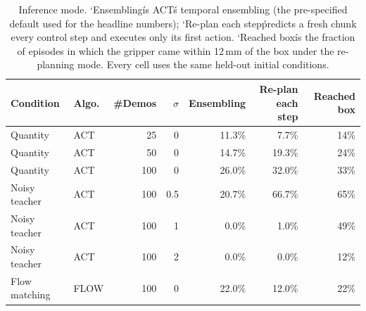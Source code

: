 \begin{table}[t]
\centering
\small
\begin{tabular}{llrrrrr}
\toprule
Condition & Algo. & \#Demos & $\sigma$ & Ensembling & Re-plan each step & Reached box \\
\midrule
Quantity & ACT & 25 & 0 & 11.3\% & 7.7\% & 14\% \\
Quantity & ACT & 50 & 0 & 14.7\% & 19.3\% & 24\% \\
Quantity & ACT & 100 & 0 & 26.0\% & 32.0\% & 33\% \\
\midrule
Noisy teacher & ACT & 100 & 0.5 & 20.7\% & 66.7\% & 65\% \\
Noisy teacher & ACT & 100 & 1 & 0.0\% & 1.0\% & 49\% \\
Noisy teacher & ACT & 100 & 2 & 0.0\% & 0.0\% & 12\% \\
\midrule
Flow matching & FLOW & 100 & 0 & 22.0\% & 12.0\% & 22\% \\
\bottomrule
\end{tabular}
\caption{Inference mode. `Ensembling\' is ACT\'s temporal ensembling (the pre-specified default used for the headline numbers); `Re-plan each step\' predicts a fresh chunk every control step and executes only its first action. `Reached box\' is the fraction of episodes in which the gripper came within 12\,mm of the box under the re-planning mode. Every cell uses the same held-out initial conditions.}
\label{tab:modes}
\end{table}
